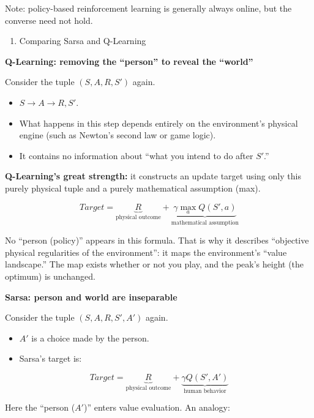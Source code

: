 Note: policy-based reinforcement learning is generally always online, but the converse need not hold.

\begin{enumerate}
\def\labelenumi{\arabic{enumi}.}
\setcounter{enumi}{1}
\tightlist
\item
  Comparing Sarsa and Q-Learning
\end{enumerate}

\textbf{Q-Learning: removing the ``person'' to reveal the ``world''}

Consider the tuple \((S,A,R,S')\) again.

\begin{itemize}
\tightlist
\item
  \(S\to A\to R,S'\).
\item
  What happens in this step depends entirely on the environment's physical engine (such as Newton's second law or game logic).
\item
  It contains no information about ``what you intend to do after \(S'\).''
\end{itemize}

\textbf{Q-Learning's great strength:} it constructs an update target using only this purely physical tuple and a purely mathematical assumption (max).

\[
Target=\underbrace{R}_{\text{physical outcome}}+\underbrace{\gamma\max_a Q(S',a)}_{\text{mathematical assumption}}
\]

No ``person (policy)'' appears in this formula. That is why it describes ``objective physical regularities of the environment'': it maps the environment's ``value landscape.'' The map exists whether or not you play, and the peak's height (the optimum) is unchanged.

\textbf{Sarsa: person and world are inseparable}

Consider the tuple \((S,A,R,S',A')\) again.

\begin{itemize}
\tightlist
\item
  \(A'\) is a choice made by the person.
\item
{}
  Sarsa's target is:
\end{itemize}

\[
Target=\underbrace{R}_{\text{physical outcome}}+\underbrace{\gamma Q(S',A')}_{\text{human behavior}}
\]

Here the ``person (\(A'\))'' enters value evaluation. An analogy:

